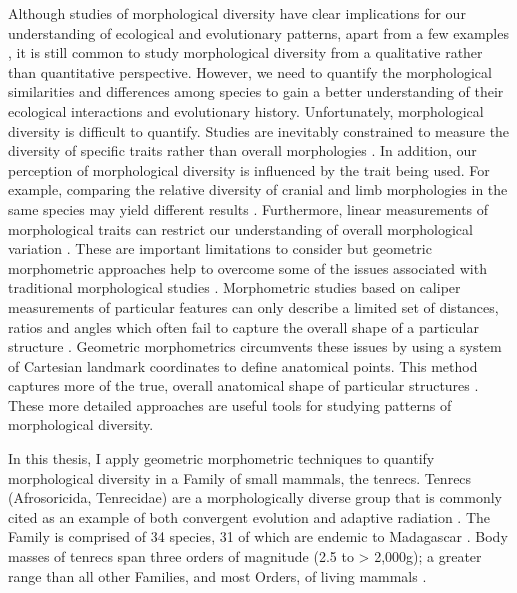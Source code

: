 	Although studies of morphological diversity have clear implications for our understanding of ecological and evolutionary patterns, apart from a few examples \citep[e.g.][]{Ruta2013, Goswami2011, Brusatte2008}, it is still common to study morphological diversity from a qualitative rather than quantitative perspective. However, we need to quantify the morphological similarities and differences among species to gain a better understanding of their ecological interactions and evolutionary history. Unfortunately, morphological diversity is difficult to quantify. Studies are inevitably constrained to measure the diversity of specific traits rather than overall morphologies \citep{Roy1997}. In addition, our perception of morphological diversity is influenced by the trait being used. For example, comparing the relative diversity of cranial and limb morphologies in the same species may yield different results \citep{Foth2012}. Furthermore, linear measurements of morphological traits can restrict our understanding of overall morphological variation \citep{Rohlf1993}. These are important limitations to consider but geometric morphometric approaches help to overcome some of the issues associated with traditional morphological studies \citep{Adams2004}. Morphometric studies based on caliper measurements of particular features can only describe a limited set of distances, ratios and angles which often fail to capture the overall shape of a particular structure \citep{Slice2007}. Geometric morphometrics circumvents these issues by using a system of Cartesian landmark coordinates to define anatomical points. This method captures more of the true, overall anatomical shape of particular structures \citep{Mitteroecker2009}. These more detailed approaches are useful tools for studying patterns of morphological diversity.
	

	
	In this thesis, I apply geometric morphometric techniques to quantify morphological diversity in a Family of small mammals, the tenrecs. Tenrecs (Afrosoricida, Tenrecidae) are a morphologically diverse group that is commonly cited as an example of both convergent evolution and adaptive radiation \citep{Soarimalala2011, Eisenberg1969}. The Family is comprised of 34 species, 31 of which are endemic to Madagascar \citep{Olson2013}. Body masses of tenrecs span three orders of magnitude (2.5 to > 2,000g); a greater range than all other Families, and most Orders, of living mammals \citep{Olson2003}.
	
